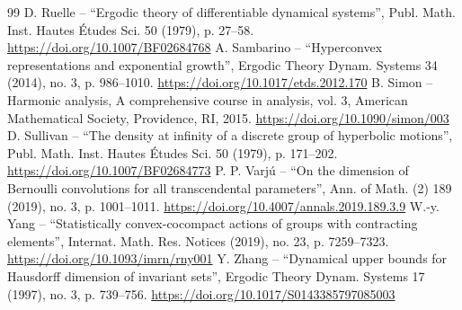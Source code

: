 \documentclass[10pt,a4paper]{amsart}
\begin{document}
\begin{thebibliography}{99}
 D. Ruelle – “Ergodic theory of differentiable dynamical systems”, Publ. Math. Inst. Hautes Études Sci. 50 (1979), p. 27–58. \url{https://doi.org/10.1007/BF02684768}
 A. Sambarino – “Hyperconvex representations and exponential growth”, Ergodic Theory Dynam. Systems 34 (2014), no. 3, p. 986–1010. \url{https://doi.org/10.1017/etds.2012.170}
 B. Simon – Harmonic analysis, A comprehensive course in analysis, vol. 3, American Mathematical Society, Providence, RI, 2015. \url{https://doi.org/10.1090/simon/003}
 D. Sullivan – “The density at infinity of a discrete group of hyperbolic motions”, Publ. Math. Inst. Hautes Études Sci. 50 (1979), p. 171–202. \url{https://doi.org/10.1007/BF02684773}
 P. P. Varjú – “On the dimension of Bernoulli convolutions for all transcendental parameters”, Ann. of Math. (2) 189 (2019), no. 3, p. 1001–1011. \url{https://doi.org/10.4007/annals.2019.189.3.9}
 W.-y. Yang – “Statistically convex-cocompact actions of groups with contracting elements”, Internat. Math. Res. Notices (2019), no. 23, p. 7259–7323. \url{https://doi.org/10.1093/imrn/rny001}
 Y. Zhang – “Dynamical upper bounds for Hausdorff dimension of invariant sets”, Ergodic Theory Dynam. Systems 17 (1997), no. 3, p. 739–756. \url{https://doi.org/10.1017/S0143385797085003}
\end{thebibliography}
\end{document}
